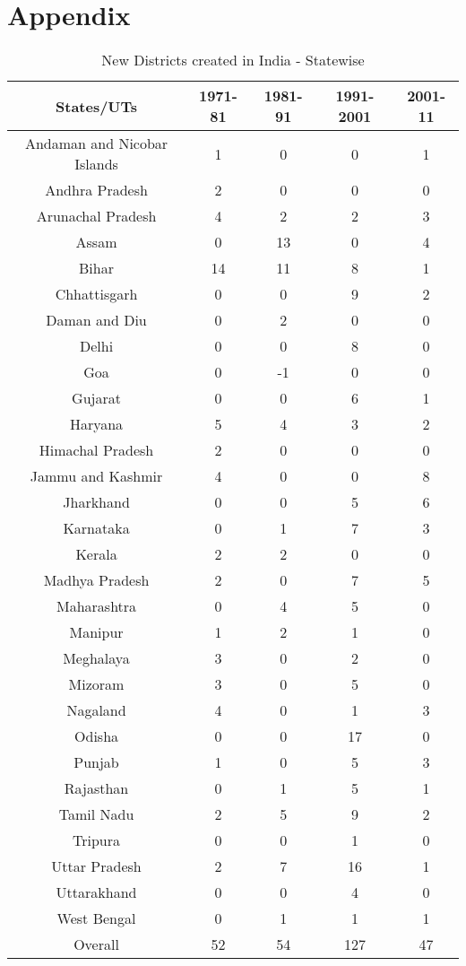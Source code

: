 \documentclass[12pt, a4paper]{article}
\begin{document}
\section{Appendix}
\begin{table}[h!]
	\centering
	\caption{New Districts created in India - Statewise}
	\label{Fig1}
	\begin{tabular}{c|cccc} 
		\hline
		States/UTs & 1971-81 & 1981-91 & 1991-2001 & 2001-11 \\
		\hline 
		Andaman and Nicobar Islands & 1 & 0 & 0 & 1  \\ 
		Andhra Pradesh & 2 & 0 & 0 & 0  \\ 
		Arunachal Pradesh & 4 & 2 & 2 & 3  \\ 
		Assam & 0 & 13 & 0 & 4  \\ 
		Bihar & 14 & 11 & 8 & 1  \\ 
		Chhattisgarh & 0 & 0 & 9 & 2  \\ 
		Daman and Diu & 0 & 2 & 0 & 0  \\ 
		Delhi & 0 & 0 & 8 & 0  \\ 
		Goa & 0 & -1 & 0 & 0  \\ 
		Gujarat & 0 & 0 & 6 & 1  \\ 
		Haryana & 5 & 4 & 3 & 2  \\ 
		Himachal Pradesh & 2 & 0 & 0 & 0  \\ 
		Jammu and Kashmir & 4 & 0 & 0 & 8  \\ 
		Jharkhand & 0 & 0 & 5 & 6  \\ 
		Karnataka & 0 & 1 & 7 & 3  \\ 
		Kerala & 2 & 2 & 0 & 0  \\ 
		Madhya Pradesh & 2 & 0 & 7 & 5  \\ 
		Maharashtra & 0 & 4 & 5 & 0  \\ 
		Manipur & 1 & 2 & 1 & 0  \\ 
		Meghalaya & 3 & 0 & 2 & 0  \\ 
		Mizoram & 3 & 0 & 5 & 0  \\ 
		Nagaland & 4 & 0 & 1 & 3  \\ 
		Odisha & 0 & 0 & 17 & 0  \\ 
		Punjab & 1 & 0 & 5 & 3  \\ 
		Rajasthan & 0 & 1 & 5 & 1  \\ 
		Tamil Nadu & 2 & 5 & 9 & 2  \\ 
		Tripura & 0 & 0 & 1 & 0  \\ 
		Uttar Pradesh & 2 & 7 & 16 & 1  \\ 
		Uttarakhand & 0 & 0 & 4 & 0  \\ 
		West Bengal & 0 & 1 & 1 & 1  \\ 
		\hline
		Overall & 52 & 54 & 127 & 47  \\ 
		\hline
	\end{tabular}
\end{table}
\end{document}
